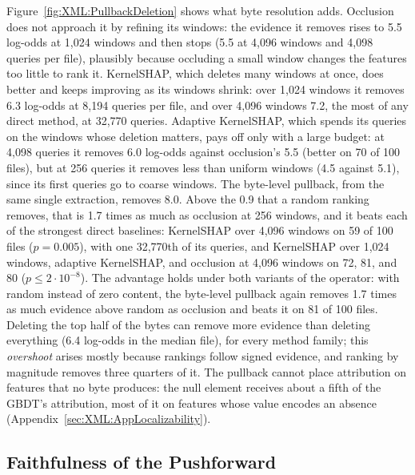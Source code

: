 Figure~\ref{fig:XML:PullbackDeletion} shows what byte resolution adds. Occlusion does not approach it by refining its
windows: the evidence it removes rises to 5.5 log-odds at 1{,}024 windows and then stops (5.5 at 4{,}096 windows and
4{,}098 queries per file), plausibly because occluding a small window changes the features too little to rank it.
KernelSHAP, which deletes many windows at once, does better and keeps improving as its windows shrink: over 1{,}024
windows it removes 6.3 log-odds at 8{,}194 queries per file, and over 4{,}096 windows 7.2, the most of any direct
method, at 32{,}770 queries. Adaptive KernelSHAP, which spends its queries on the windows whose
deletion matters, pays off only with a large budget: at 4{,}098 queries it removes 6.0 log-odds against occlusion's 5.5
(better on 70 of 100 files), but at 256 queries it removes less than uniform windows (4.5 against 5.1), since its first
queries go to coarse windows. The byte-level pullback, from the same single extraction, removes 8.0.
Above the 0.9 that a random ranking removes, that is 1.7 times as much as occlusion at 256 windows, and it beats each
of the strongest direct baselines: KernelSHAP over 4{,}096 windows on 59 of 100 files ($p = 0.005$), with one
32{,}770th of its queries, and KernelSHAP over 1{,}024 windows, adaptive KernelSHAP, and occlusion at 4{,}096 windows on
72, 81, and 80 ($p \leq 2 \cdot 10^{-8}$). The advantage holds under both variants of the operator: with random instead of zero content, the byte-level
pullback again removes 1.7 times as much evidence above random as occlusion and beats it on 81 of 100 files. Deleting
the top half of the bytes can remove more evidence than deleting everything (6.4 log-odds in the median file), for
every method family; this \emph{overshoot} arises mostly because rankings
follow signed evidence, and ranking by magnitude removes three quarters of it. The pullback cannot place attribution on features that no byte
produces: the null element
receives about a fifth of the GBDT's attribution, most of it on features whose value encodes an absence
(Appendix~\ref{sec:XML:AppLocalizability}).

\subsection{Faithfulness of the Pushforward}
\label{sec:XML:PushforwardFaithfulness}

